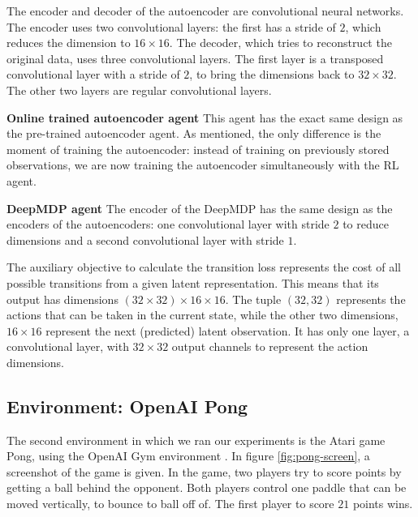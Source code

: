 The encoder and decoder of the autoencoder are convolutional neural networks. The encoder uses two convolutional layers: the first has a stride of $2$, which reduces the dimension to $16 \times 16$. The decoder, which tries to reconstruct the original data, uses three convolutional layers. The first layer is a transposed convolutional layer with a stride of $2$, to bring the dimensions back to $32 \times 32$. The other two layers are regular convolutional layers. \newline
 
\noindent \textbf{Online trained autoencoder agent}\newline
\noindent  This agent has the exact same design as the pre-trained autoencoder agent. As mentioned, the only difference is the moment of training the autoencoder: instead of training on previously stored observations, we are now training the autoencoder simultaneously with the RL agent. \newline

\noindent \textbf{DeepMDP agent}\newline
\noindent The encoder of the DeepMDP has the same design as the encoders of the autoencoders: one convolutional layer with stride $2$ to reduce dimensions and a second convolutional layer with stride $1$. 

The auxiliary objective to calculate the transition loss represents the cost of all possible transitions from a given latent representation. This means that its output has dimensions $(32 \times 32) \times 16 \times 16$. The tuple $(32, 32)$ represents the actions that can be taken in the current state, while the other two dimensions, $16 \times 16$ represent the next (predicted) latent observation. It has only one layer, a convolutional layer, with $32 \times 32$ output channels to represent the action dimensions.

\subsection{Environment: OpenAI Pong}\label{research-env-pong}
The second environment in which we ran our experiments is the Atari game Pong, using the OpenAI Gym environment \cite{pong}. In figure \ref{fig:pong-screen}, a screenshot of the game is given. In the game, two players try to score points by getting a ball behind the opponent. Both players control one paddle that can be moved vertically, to bounce to ball off of. The first player to score $21$ points wins.


